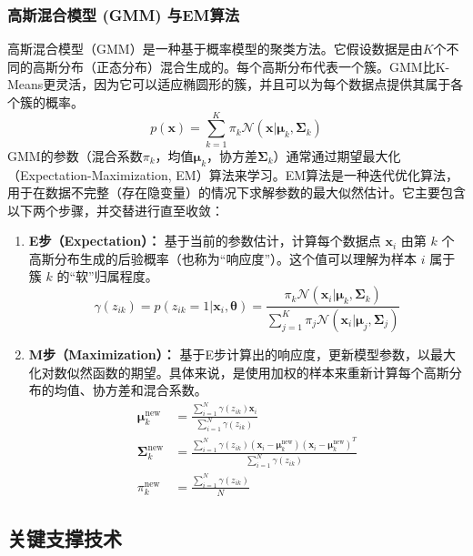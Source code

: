 \documentclass{SYSUReport}
\begin{document}
\subsubsection{高斯混合模型 (GMM) 与EM算法}
高斯混合模型（GMM）是一种基于概率模型的聚类方法。它假设数据是由$K$个不同的高斯分布（正态分布）混合生成的。每个高斯分布代表一个簇。GMM比K-Means更灵活，因为它可以适应椭圆形的簇，并且可以为每个数据点提供其属于各个簇的概率。
\begin{equation}
    p(\mathbf{x}) = \sum_{k=1}^{K} \pi_k \mathcal{N}(\mathbf{x} | \boldsymbol{\mu}_k, \boldsymbol{\Sigma}_k)
\end{equation}
GMM的参数（混合系数$\pi_k$，均值$\boldsymbol{\mu}_k$，协方差$\boldsymbol{\Sigma}_k$）通常通过期望最大化（Expectation-Maximization, EM）算法来学习。EM算法是一种迭代优化算法，用于在数据不完整（存在隐变量）的情况下求解参数的最大似然估计。它主要包含以下两个步骤，并交替进行直至收敛：
\begin{enumerate}
    \item \textbf{E步（Expectation）：} 基于当前的参数估计，计算每个数据点 $\mathbf{x}_i$ 由第 $k$ 个高斯分布生成的后验概率（也称为“响应度”）。这个值可以理解为样本 $i$ 属于簇 $k$ 的“软”归属程度。
    \begin{equation}
        \gamma(z_{ik}) = p(z_{ik}=1 | \mathbf{x}_i, \boldsymbol{\theta}) = \frac{\pi_k \mathcal{N}(\mathbf{x}_i | \boldsymbol{\mu}_k, \boldsymbol{\Sigma}_k)}{\sum_{j=1}^{K} \pi_j \mathcal{N}(\mathbf{x}_i | \boldsymbol{\mu}_j, \boldsymbol{\Sigma}_j)}
    \end{equation}
    \item \textbf{M步（Maximization）：} 基于E步计算出的响应度，更新模型参数，以最大化对数似然函数的期望。具体来说，是使用加权的样本来重新计算每个高斯分布的均值、协方差和混合系数。
    \begin{align}
        \boldsymbol{\mu}_k^{\text{new}} &= \frac{\sum_{i=1}^{N} \gamma(z_{ik}) \mathbf{x}_i}{\sum_{i=1}^{N} \gamma(z_{ik})} \\
        \boldsymbol{\Sigma}_k^{\text{new}} &= \frac{\sum_{i=1}^{N} \gamma(z_{ik}) (\mathbf{x}_i - \boldsymbol{\mu}_k^{\text{new}})(\mathbf{x}_i - \boldsymbol{\mu}_k^{\text{new}})^T}{\sum_{i=1}^{N} \gamma(z_{ik})} \\
        \pi_k^{\text{new}} &= \frac{\sum_{i=1}^{N} \gamma(z_{ik})}{N}
    \end{align}
\end{enumerate}


\subsection{关键支撑技术}
\end{document}
